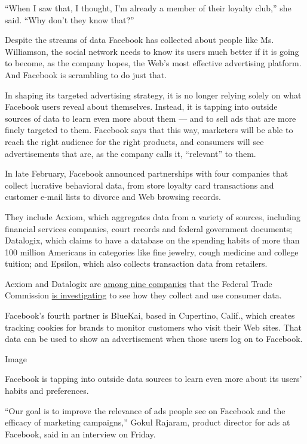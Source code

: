 ``When I saw that, I thought, I'm already a member of their loyalty
club,'' she said. ``Why don't they know that?''

Despite the streams of data Facebook has collected about people like Ms.
Williamson, the social network needs to know its users much better if it
is going to become, as the company hopes, the Web's most effective
advertising platform. And Facebook is scrambling to do just that.

In shaping its targeted advertising strategy, it is no longer relying
solely on what Facebook users reveal about themselves. Instead, it is
tapping into outside sources of data to learn even more about them ---
and to sell ads that are more finely targeted to them. Facebook says
that this way, marketers will be able to reach the right audience for
the right products, and consumers will see advertisements that are, as
the company calls it, ``relevant'' to them.

In late February, Facebook announced partnerships with four companies
that collect lucrative behavioral data, from store loyalty card
transactions and customer e-mail lists to divorce and Web browsing
records.

They include Acxiom, which aggregates data from a variety of sources,
including financial services companies, court records and federal
government documents; Datalogix, which claims to have a database on the
spending habits of more than 100 million Americans in categories like
fine jewelry, cough medicine and college tuition; and Epsilon, which
also collects transaction data from retailers.

Acxiom and Datalogix are
\href{http://www.ftc.gov/opa/2012/12/databrokers.shtm}{among nine
companies} that the Federal Trade Commission
\href{http://www.nytimes.com/2012/07/25/technology/congress-opens-inquiry-into-data-brokers.html}{is
investigating} to see how they collect and use consumer data.

Facebook's fourth partner is BlueKai, based in Cupertino, Calif., which
creates tracking cookies for brands to monitor customers who visit their
Web sites. That data can be used to show an advertisement when those
users log on to Facebook.

Image

Facebook is tapping into outside data sources to learn even more about
its users' habits and preferences.

``Our goal is to improve the relevance of ads people see on Facebook and
the efficacy of marketing campaigns,'' Gokul Rajaram, product director
for ads at Facebook, said in an interview on Friday.

